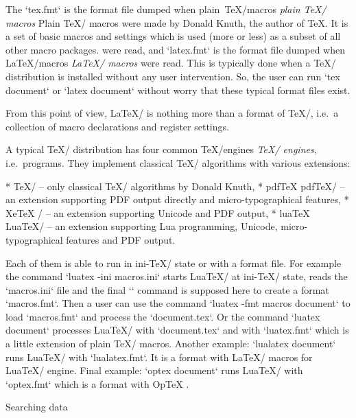 The `tex.fmt` is the format file dumped when \ii plain~TeX/macros {\em plain \TeX/ macros}\fnote
{Plain \TeX/ macros were made by Donald Knuth, the author of \TeX. It is a
set of basic macros and settings which is used (more or less) as a subset of
all other macro packages.} 
were read, and `latex.fmt` is the format file dumped when \ii LaTeX/macros {\em \LaTeX/ macros} were read.
This is typically done when a \TeX/ distribution is installed without any user
intervention. So, the user can run `tex document` or `latex document` without
worry that these typical format files exist.

From this point of view, \LaTeX/ is nothing more than a format of \TeX/,
i.e.~a collection of macro declarations and register settings.

A typical \TeX/ distribution has four common \ii TeX/engines {\em \TeX/ engines}, i.e.~programs.
They implement classical \TeX/ algorithms with various extensions: 

\begitems
* \TeX/ -- only classical \TeX/ algorithms by Donald Knuth, 
* \ii pdfTeX pdf\TeX/ -- an extension supporting PDF output directly and
             micro-typographical features,
* \ii XeTeX \XeTeX/ -- an extension supporting Unicode and PDF output, 
* \ii luaTeX Lua\TeX/ -- an extension supporting Lua programming, Unicode,
            micro-typographical features and PDF output.
\enditems

Each of them is able to run in ini-\TeX/ state or with a format file. For
example the command `luatex -ini macros.ini` starts Lua\TeX/ at ini-\TeX/ state,
reads the `macros.ini` file and the final `\dump` command is supposed here to create
a format `macros.fmt`. Then a user can use the command `luatex -fmt macros document` to
load `macros.fmt` and process the `document.tex`.
Or the command `luatex document` processes Lua\TeX/ with `document.tex` and 
with `luatex.fmt` which is a little extension of plain \TeX/ macros. Another example:
`lualatex document` runs Lua\TeX/ with `lualatex.fmt`. It is a format with
\LaTeX/ macros for Lua\TeX/ engine. Final example: 
`optex document` runs Lua\TeX/ with `optex.fmt` which is
a format with \ii OpTeX .

\sec Searching data

